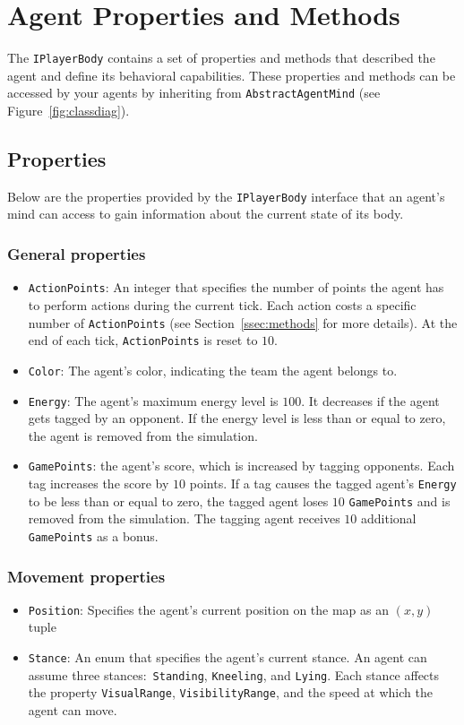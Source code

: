 \documentclass[
  a4paper,
  english,
  DIV=16,
  11pt,
  parskip=half,
  dvipsnames,
  listof=totoc,		     %
  index=totoc,		     %
  bibliography=totoc,	 %
]{scrartcl}
\begin{document}
\section{Agent Properties and Methods} \label{sec:AgentDesc}
The \texttt{IPlayerBody} contains a set of properties and methods that described the agent and define its behavioral capabilities. These properties and methods can be accessed by your agents by inheriting from \texttt{AbstractAgentMind} (see Figure~\ref{fig:classdiag}).
%
\subsection{Properties} \label{ssec:props}
Below are the properties provided by the \texttt{IPlayerBody} interface that an agent's mind can access to gain information about the current state of its body.
%
\subsubsection{General properties} \label{sssec:genAttr}
\begin{itemize}
  \item \texttt{ActionPoints}: An integer that specifies the number of points the agent has to perform actions during the current tick. Each action costs a specific number of \texttt{ActionPoints} (see Section~\ref{ssec:methods} for more details). At the end of each tick, \texttt{ActionPoints} is reset to $10$.
  \item \texttt{Color}: The agent's color, indicating the team the agent belongs to.
  \item \texttt{Energy}: The agent's maximum energy level is $100$. It decreases if the agent gets tagged by an opponent. If the energy level is less than or equal to zero, the agent is removed from the simulation.
  \item \texttt{GamePoints}: the agent's score, which is increased by tagging opponents. Each tag increases the score by $10$ points. If a tag causes the tagged agent's \texttt{Energy} to be less than or equal to zero, the tagged agent loses $10$ \texttt{GamePoints} and is removed from the simulation. The tagging agent receives $10$ additional \texttt{GamePoints} as a bonus.
\end{itemize}
%
\subsubsection{Movement properties} \label{sssec:movAttr}
\begin{itemize}
  \item \texttt{Position}: Specifies the agent's current position on the map as an $(x,y)$ tuple
  \item \texttt{Stance}: An enum that specifies the agent's current stance. An agent can assume three stances:~\texttt{Standing}, \texttt{Kneeling}, and \texttt{Lying}. Each stance affects the property \texttt{VisualRange}, \texttt{VisibilityRange}, and the speed at which the agent can move.
\end{itemize}
%
\end{document}
